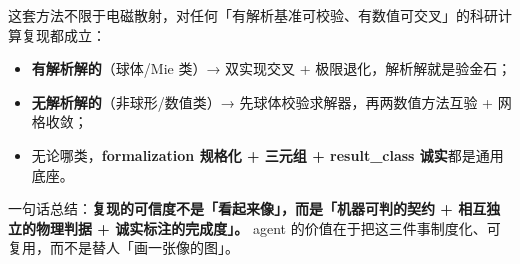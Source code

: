 这套方法不限于电磁散射，对任何「有解析基准可校验、有数值可交叉」的科研计算复现都成立：

\begin{itemize}
  \item \textbf{有解析解的}（球体/Mie 类）→ 双实现交叉 + 极限退化，解析解就是验金石；
  \item \textbf{无解析解的}（非球形/数值类）→ 先球体校验求解器，再两数值方法互验 + 网格收敛；
  \item 无论哪类，\textbf{formalization 规格化 + 三元组 + result\_class 诚实}都是通用底座。
\end{itemize}

\begin{important}
一句话总结：\textbf{复现的可信度不是「看起来像」，而是「机器可判的契约 + 相互独立的物理判据 + 诚实标注的完成度」。} agent 的价值在于把这三件事制度化、可复用，而不是替人「画一张像的图」。
\end{important}
